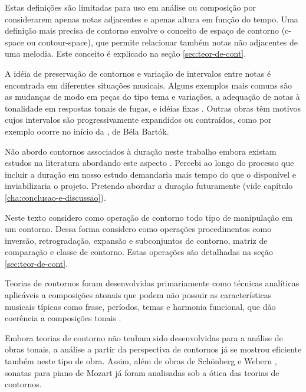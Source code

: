 Estas definições são limitadas para uso em análise ou composição por
considerarem apenas notas adjacentes e apenas altura em função do
tempo. Uma definição mais precisa de contorno envolve o conceito de
espaço de contorno (c-space ou contour-space), que permite relacionar
também notas não adjacentes de uma melodia. Este conceito é explicado
na seção \ref{sec:teor-de-cont}.

A idéia de preservação de contornos e variação de intervalos entre
notas é encontrada em diferentes situações musicais. Alguns exemplos
mais comuns são as mudanças de modo em peças do tipo tema e variações,
a adequação de notas à tonalidade em respostas tonais de fugas,
 e idéias fixas
\cite[p. 29]{morris87:composition}. Outras obras têm motivos cujos
intervalos são progressivamente expandidos ou contraídos, como por
exemplo ocorre no início da , de Béla Bartók.

Não abordo contornos associados à duração neste trabalho embora
existam estudos na literatura abordando este aspecto
\cite{beard03:contour}. Percebi ao longo do processo que incluir a
duração em nosso estudo demandaria mais tempo do que o disponível e
inviabilizaria o projeto. Pretendo abordar a duração futuramente (vide
capítulo \ref{cha:conclusao-e-discussao}).

Neste texto considero como operação de contorno todo tipo de
manipulação em um contorno. Dessa forma considero como operações
procedimentos como inversão, retrogradação, expansão e subconjuntos de
contorno, matriz de comparação e classe de contorno. Estas operações
são detalhadas na seção \ref{sec:teor-de-cont}.

Teorias de contornos foram desenvolvidas primariamente como técnicas
analíticas aplicáveis a composições atonais que podem não possuir as
características musicais típicas como frase, períodos, temas e
harmonia funcional, que dão coerência a composições tonais
\cite[p. 1]{beard03:contour}.

Embora teorias de contorno não tenham sido desenvolvidas para a
análise de obras tonais, a análise a partir da perspectiva de
contornos já se mostrou eficiente também neste tipo de obra. Assim,
além de obras de Schönberg \cite{friedmann85:methodology} e Webern
\cite{clifford95:contour}, sonatas para piano de Mozart
\cite{beard03:contour} já foram analisadas sob a ótica das teorias de
contornos.

